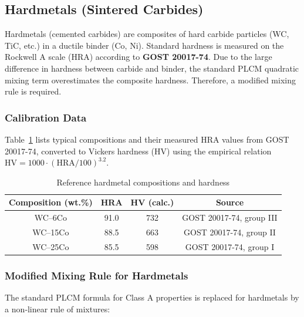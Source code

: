 \documentclass[12pt,a4paper]{article}
\begin{document}
	
	\subsection{Hardmetals (Sintered Carbides)}
	\label{subsec:hardmetals}
	
	Hardmetals (cemented carbides) are composites of hard carbide particles (WC, TiC, etc.) in a ductile binder (Co, Ni). Standard hardness is measured on the Rockwell A scale (HRA) according to \textbf{GOST 20017-74}. Due to the large difference in hardness between carbide and binder, the standard PLCM quadratic mixing term overestimates the composite hardness. Therefore, a modified mixing rule is required.
	
	\subsubsection{Calibration Data}
	Table~\ref{tab:hardmetal_compositions} lists typical compositions and their measured HRA values from GOST 20017-74, converted to Vickers hardness (HV) using the empirical relation $\text{HV} = 1000 \cdot (\text{HRA}/100)^{3.2}$.
	
	\begin{table}[htbp]
		\centering
		\caption{Reference hardmetal compositions and hardness}
		\label{tab:hardmetal_compositions}
		\begin{tabular}{cccc}
			\toprule
			\textbf{Composition (wt.\%)} & \textbf{HRA} & \textbf{HV} (calc.) & \textbf{Source} \\
			\midrule
			WC–6Co & 91.0 & 732 & GOST 20017-74, group III \\
			WC–15Co & 88.5 & 663 & GOST 20017-74, group II \\
			WC–25Co & 85.5 & 598 & GOST 20017-74, group I \\
			\bottomrule
		\end{tabular}
	\end{table}
	
	\subsubsection{Modified Mixing Rule for Hardmetals}
	The standard PLCM formula for Class A properties is replaced for hardmetals by a non‑linear rule of mixtures:
	
\end{document}
